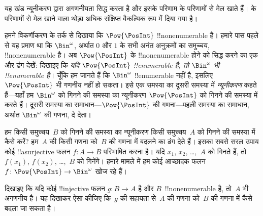 \documentclass[../../../include/open-logic-section]{subfiles}
\begin{document}


\begin{editorial}
  यह खंड न्यूनीकरण द्वारा अगणनीयता सिद्ध करता है और इसके परिणाम
   के परिणामों से मेल खाते हैं।  के
  परिणामों से मेल खाने वाला थोड़ा अधिक संक्षिप्त वैकल्पिक रूप
   में दिया गया है।
\end{editorial}

हमने विकर्णीकरण के तर्क से दिखाया कि $\Pow{\PosInt}$ !!{nonenumerable} है।
हमारे पास पहले से यह प्रमाण था कि $\Bin^\omega$, अर्थात $0$ और $1$ के सभी
अनंत अनुक्रमों का समुच्चय, !!{nonenumerable} है। अब $\Pow{\PosInt}$ के
!!{nonenumerable} होने को सिद्ध करने का एक और ढंग देखें: दिखाइए कि \emph{यदि
$\Pow{\PosInt}$ !!{enumerable} है, तो $\Bin^\omega$ भी !!{enumerable} है}।
चूँकि हम जानते हैं कि $\Bin^\omega$ !!{enumerable} नहीं है, इसलिए
$\Pow{\PosInt}$ भी गणनीय नहीं हो सकता। इसे एक समस्या का दूसरी
समस्या में \emph{न्यूनीकरण} कहते हैं---यहाँ हम $\Bin^\omega$ को गिनने की
समस्या का न्यूनीकरण $\Pow{\PosInt}$ को गिनने की समस्या में करते हैं। दूसरी
समस्या का समाधान---$\Pow{\PosInt}$ की गणना---पहली समस्या का समाधान,
अर्थात $\Bin^\omega$ की गणना, दे देता।

हम किसी समुच्चय~$B$ को गिनने की समस्या का न्यूनीकरण किसी समुच्चय~$A$ को
गिनने की समस्या में कैसे करें? हम~$A$ की किसी गणना को~$B$ की गणना में बदलने
का ढंग देते हैं। इसका सबसे सरल उपाय कोई !!a{surjective} फलन
$f\colon A \to B$ परिभाषित करना है। यदि $x_1$, $x_2$, \dots{},~$A$ को
गिनते हैं, तो $f(x_1)$, $f(x_2)$, \dots{},~$B$ को गिनेंगे। हमारे मामले में
हम कोई आच्छादक फलन $f\colon \Pow{\PosInt} \to \Bin^\omega$ खोज रहे हैं।

\begin{prob}
दिखाइए कि यदि कोई !!{injective} फलन $g\colon B \to A$ है और
$B$~!!{nonenumerable} है, तो~$A$ भी अगणनीय है। यह दिखाकर ऐसा
कीजिए कि~$g$ की सहायता से~$A$ की गणना को~$B$ की गणना में कैसे बदला जा सकता
है।
\end{prob}
\end{document}
